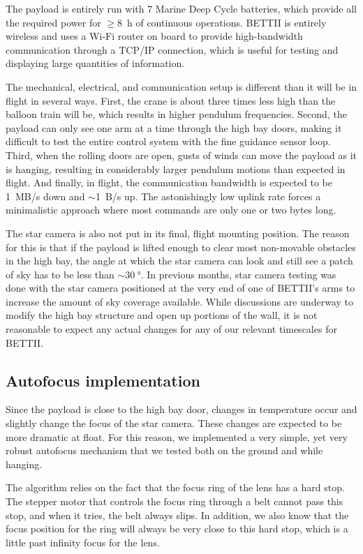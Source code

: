 The payload is entirely run with 7 Marine Deep Cycle batteries, which provide all the required power for $\ge$\SI{8}{\hour} of continuous operations. BETTII is entirely wireless and uses a Wi-Fi router on board to provide high-bandwidth communication through a TCP/IP connection, which is useful for testing and displaying large quantities of information.

The mechanical, electrical, and communication setup is different than it will be in flight in several ways. First, the crane is about three times less high than the balloon train will be, which results in higher pendulum frequencies. Second, the payload can only see one arm at a time through the high bay doors, making it difficult to test the entire control system with the fine guidance sensor loop. Third, when the rolling doors are open, gusts of winds can move the payload as it is hanging, resulting in considerably larger pendulum motions than expected in flight. And finally, in flight, the communication bandwidth is expected to be 1~MB/s down and $\sim$1~B/s up. The astonishingly low uplink rate forces a minimalistic approach where most commands are only one or two bytes long. 

The star camera is also not put in its final, flight mounting position. The reason for this is that if the payload is lifted enough to clear most non-movable obstacles in the high bay, the angle at which the star camera can look and still see a patch of sky has to be less than $\sim \SI{30}{\degree}$. In previous months, star camera testing was done with the star camera positioned at the very end of one of BETTII's arms to increase the amount of sky coverage available. While discussions are underway to modify the high bay structure and open up portions of the wall, it is not reasonable to expect any actual changes for any of our relevant timescales for BETTII.


\subsection{Autofocus implementation}

Since the payload is close to the high bay door, changes in temperature occur and slightly change the focus of the star camera. These changes are expected to be more dramatic at float. For this reason, we implemented a very simple, yet very robust autofocus mechanism that we tested both on the ground and while hanging.

The algorithm relies on the fact that the focus ring of the lens has a hard stop. The stepper motor that controls the focus ring through a belt cannot pass this stop, and when it tries, the belt always slips. In addition, we also know that the focus position for the ring will always be very close to this hard stop, which is a little past infinity focus for the lens. 

